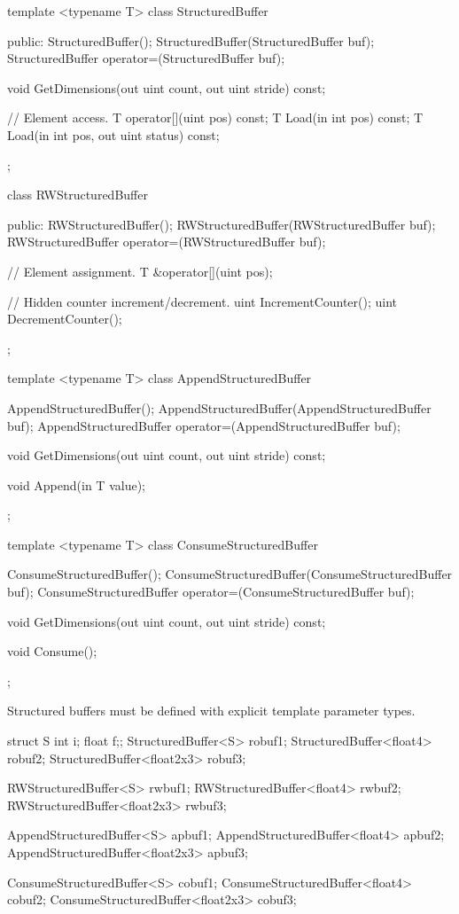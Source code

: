 \begin{HLSL}
template <typename T>
 class StructuredBuffer {
 public:
   StructuredBuffer();
   StructuredBuffer(StructuredBuffer buf);
   StructuredBuffer operator=(StructuredBuffer buf);

   void GetDimensions(out uint count, out uint stride) const;

   // Element access.
   T operator[](uint pos) const;
   T Load(in int pos) const;
   T Load(in int pos, out uint status) const;
};

 class RWStructuredBuffer {
 public:
   RWStructuredBuffer();
   RWStructuredBuffer(RWStructuredBuffer buf);
   RWStructuredBuffer operator=(RWStructuredBuffer buf);

   // Element assignment.
   T &operator[](uint pos);

   // Hidden counter increment/decrement.
   uint IncrementCounter();
   uint DecrementCounter();
};

template <typename T>
 class AppendStructuredBuffer {
   AppendStructuredBuffer();
   AppendStructuredBuffer(AppendStructuredBuffer buf);
   AppendStructuredBuffer operator=(AppendStructuredBuffer buf);

   void GetDimensions(out uint count, out uint stride) const;

   void Append(in T value);
};

template <typename T>
 class ConsumeStructuredBuffer {
   ConsumeStructuredBuffer();
   ConsumeStructuredBuffer(ConsumeStructuredBuffer buf);
   ConsumeStructuredBuffer operator=(ConsumeStructuredBuffer buf);

   void GetDimensions(out uint count, out uint stride) const;

   void Consume();
};

\end{HLSL}


Structured buffers must be defined with explicit template parameter types.
\begin{HLSL}
  struct S {int i; float f;};
  StructuredBuffer<S> robuf1;
  StructuredBuffer<float4> robuf2;
  StructuredBuffer<float2x3> robuf3;

  RWStructuredBuffer<S> rwbuf1;
  RWStructuredBuffer<float4> rwbuf2;
  RWStructuredBuffer<float2x3> rwbuf3;

  AppendStructuredBuffer<S> apbuf1;
  AppendStructuredBuffer<float4> apbuf2;
  AppendStructuredBuffer<float2x3> apbuf3;

  ConsumeStructuredBuffer<S> cobuf1;
  ConsumeStructuredBuffer<float4> cobuf2;
  ConsumeStructuredBuffer<float2x3> cobuf3;
\end{HLSL}

